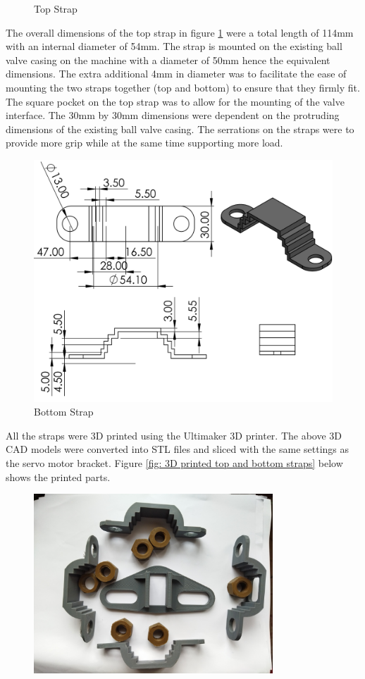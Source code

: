 \begin{enumerate}
\begin{figure}[H]
\caption{Top Strap}
\label{fig: Top Strap}
\end{figure}
The overall dimensions of the top strap in figure \ref{fig: Top Strap} were a total length of 114mm with an internal diameter of 54mm. The strap is mounted on the existing ball valve casing on the machine with a diameter of 50mm hence the equivalent dimensions. The extra additional 4mm in diameter was to facilitate the ease of mounting the two straps together (top and bottom) to ensure that they firmly fit. The square pocket on the top strap was to allow for the mounting of the valve interface. The 30mm by 30mm dimensions were dependent on the protruding dimensions of the existing ball valve casing. The serrations on the straps were to provide more grip while at the same time supporting more load. 
\begin{figure}[H]
\centering
\includegraphics [width=.8\textwidth]{Figures/twoRailStrapsBottom.PNG}
\caption{Bottom Strap}
\label{fig: Bottom Strap}
\end{figure}
All the straps were 3D printed using the Ultimaker 3D printer. The above 3D CAD models were converted into STL files and sliced with the same settings as the servo motor bracket. Figure \ref{fig: 3D printed top and bottom straps} below shows the printed parts.
\begin{figure}[H]
    \centering
    \includegraphics[width=0.8\textwidth]{Figures/IMG_20220930_073222.jpg}

\end{figure}
\end{enumerate}
